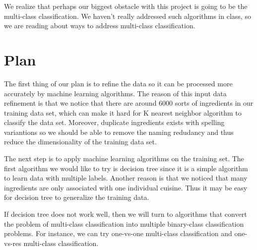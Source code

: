 \documentclass[11pt]{article}
\begin{document}
We realize that perhaps our biggest obstacle with this project is
going to be the multi-class classification.  We haven't really
addressed such algorithms in class, so we are reading about ways to
address multi-class classification.\cite{wiki}


\section{Plan}
\label{sec:plan}

The first thing of our plan is to refine the data so it can be processed more accurately by machine learning algorithms. The reason of this input data refinement is that
we notice that there are around $6000$ sorts of ingredients in our training data set, which can make it hard for K nearest neighbor algorithm to classify the data set.
Moreover, duplicate ingredients exists with spelling variantions so we should be able to remove the naming redudancy and thus reduce the dimensionality of the training data set.

The next step is to apply machine learning algorithms on the training set. The first algorithm we would like to try is decision tree since it is a simple algorithm to learn data with multiple labels. Another reason is that we noticed that many ingredients are only associated with one individual cuisine. Thus it may be easy for decision tree to generalize the training data.

If decision tree does not work well, then we will turn to algorithms that convert the problem of multi-class classification into multiple binary-class classification problems. For instance, we can try one-vs-one multi-class classification\cite{wiki} and one-vs-res multi-class classification\cite{wiki}.  



\end{document}
